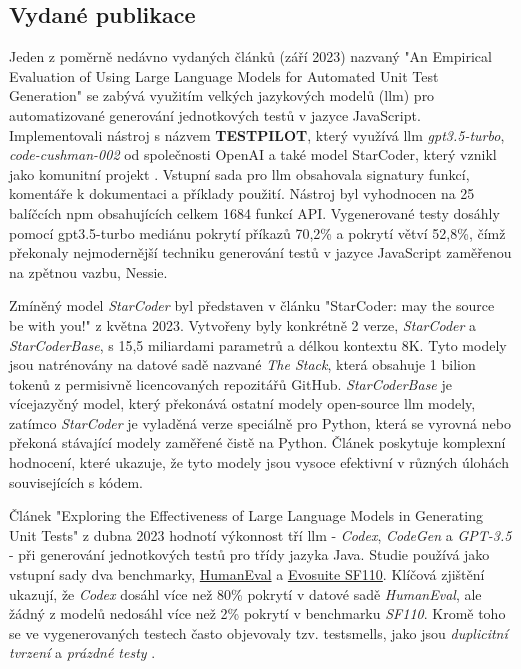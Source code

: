 \documentclass[czech, ma, kiv, he, iso690alph, pdf, viewonly]{fasthesis}
\begin{document}
    \subsection{Vydané publikace}
    Jeden z poměrně nedávno vydaných článků (září 2023) nazvaný "An Empirical Evaluation of Using Large Language Models for Automated Unit Test Generation" \cite{schafer2023empirical} se zabývá využitím velkých jazykových modelů (\gls{llm}) pro automatizované generování jednotkových testů v jazyce JavaScript. Implementovali nástroj s názvem \textbf{TESTPILOT}, který využívá \gls{llm} \textit{gpt3.5-turbo}, \textit{code-cushman-002} od společnosti OpenAI a  také model StarCoder, který vznikl jako komunitní projekt \cite{StarCoder2023}. Vstupní sada pro \gls{llm} obsahovala signatury funkcí, komentáře k dokumentaci a příklady použití. Nástroj byl vyhodnocen na 25 balíčcích npm obsahujících celkem 1684 funkcí API. Vygenerované testy dosáhly pomocí gpt3.5-turbo mediánu pokrytí příkazů 70,2\% a pokrytí větví 52,8\%, čímž překonaly nejmodernější techniku generování testů v jazyce JavaScript zaměřenou na zpětnou vazbu, Nessie.

    Zmíněný model \emph{StarCoder} byl představen v článku "StarCoder: may the source be with you!" \cite{StarCoder2023} z května 2023. Vytvořeny byly konkrétně 2 verze, \textit{StarCoder} a \textit{StarCoderBase}, s 15,5 miliardami parametrů a délkou kontextu 8K. Tyto modely jsou natrénovány na datové sadě nazvané \textit{The Stack}, která obsahuje 1 bilion tokenů z permisivně licencovaných repozitářů GitHub. \textit{StarCoderBase} je vícejazyčný model, který překonává ostatní modely open-source \gls{llm} modely, zatímco \textit{StarCoder} je vyladěná verze speciálně pro Python, která se vyrovná nebo překoná stávající modely zaměřené čistě na Python. Článek poskytuje komplexní hodnocení, které ukazuje, že tyto modely jsou vysoce efektivní v různých úlohách souvisejících s kódem.

    Článek "Exploring the Effectiveness of Large Language Models in Generating Unit Tests" \cite{siddiq2023exploring} z dubna 2023 hodnotí výkonnost tří \gls{llm} - \textit{Codex}, \textit{CodeGen} a \textit{GPT-3.5} - při generování jednotkových testů pro třídy jazyka Java. Studie používá jako vstupní sady dva benchmarky, \href{https://paperswithcode.com/dataset/humaneval-x}{HumanEval} a \href{https://paperswithcode.com/dataset/evosuite-sf110-benchmark}{Evosuite SF110}. Klíčová zjištění ukazují, že \textit{Codex} dosáhl více než 80\% pokrytí v datové sadě \textit{HumanEval}, ale žádný z modelů nedosáhl více než 2\% pokrytí v benchmarku \textit{SF110}. Kromě toho se ve vygenerovaných testech často objevovaly tzv. \gls{testsmells}, jako jsou \textit{duplicitní tvrzení} a \textit{prázdné testy} \cite{testsmells}.
\end{document}
